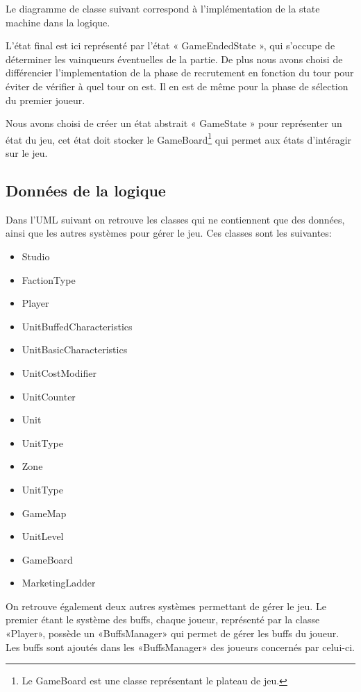 Le diagramme de classe suivant correspond à l'implémentation de la state machine
dans la logique.


L'état final est ici représenté par l'état « GameEndedState », qui s'occupe de
déterminer les vainqueurs éventuelles de la partie.
De plus nous avons choisi de différencier l'implementation de la phase de
recrutement en fonction du tour pour éviter de vérifier à quel tour on est.
Il en est de même pour la phase de sélection du premier joueur.

Nous avons choisi de créer un état abstrait « GameState » pour
représenter un état du jeu, cet état doit stocker le GameBoard\footnote{Le GameBoard
  est une classe représentant le plateau de jeu.}
qui permet aux états d'intéragir sur le jeu.

\subsection{Données de la logique}

Dans l'UML suivant on retrouve les classes qui ne contiennent que des données,
ainsi que les autres systèmes pour gérer le jeu.
Ces classes sont les suivantes:
\begin{itemize}
    \item Studio
    \item FactionType
    \item Player
    \item UnitBuffedCharacteristics
    \item UnitBasicCharacteristics
    \item UnitCostModifier
    \item UnitCounter
    \item Unit
    \item UnitType
    \item Zone
    \item UnitType
    \item GameMap
    \item UnitLevel
    \item GameBoard
    \item MarketingLadder
\end{itemize}


On retrouve également deux autres systèmes permettant de gérer le jeu.
Le premier étant le système des buffs, chaque joueur, représenté par la classe
«Player», possède un «BuffsManager» qui permet de gérer les buffs du joueur.
Les buffs sont ajoutés dans les «BuffsManager» des joueurs concernés par
celui-ci.

